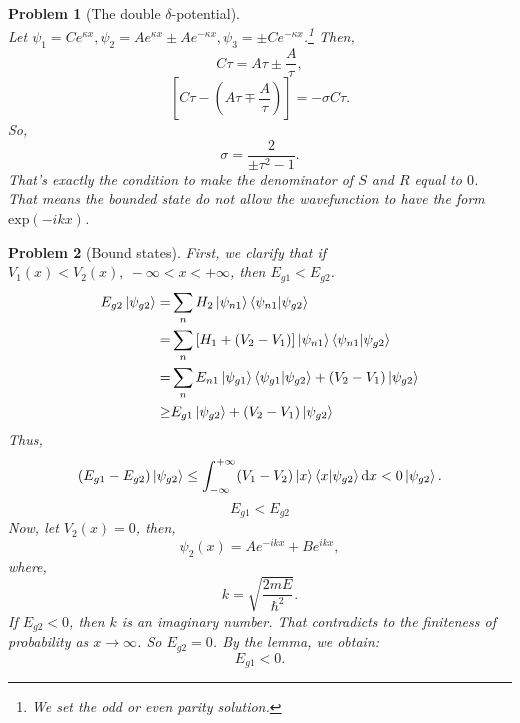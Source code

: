 \documentclass{article}
\theoremstyle{1}
\newtheorem{problem}{Problem}
\begin{document}
\begin{problem}[The double $\delta$-potential]
\begin{equation}
\end{equation}
Let $\psi_1=Ce^{\kappa x},\psi_2=Ae^{\kappa x}\pm Ae^{-\kappa x},\psi_3=\pm Ce^{-\kappa x}$.\footnote{We set the odd or even parity solution.} Then,
\begin{equation}
    C\tau=A\tau\pm\frac{A}{\tau},
\end{equation}
\begin{equation}
    \left[C\tau-\left(A\tau \mp\frac{A}{\tau}\right)\right]=-\sigma C\tau.
\end{equation}
So,
\begin{equation}
    \sigma=\frac{2}{\pm\tau^2-1}.
\end{equation}
That's exactly the condition to make the denominator of $S$ and $R$ equal to $0$. That means the bounded state do not allow the wavefunction to have the form $\mathrm{exp}(-ikx)$.
\end{problem}
\begin{problem}[Bound states]
First, we clarify that if $V_1(x)<V_2(x),\ -\infty<x<+\infty$, then $E_{g1}<E_{g2}$. 
\begin{align}
    E_{g2}\ket{\psi_{g2}}=&\sum_{n}H_2\ket{\psi_{n1}}\braket{\psi_{n1}}{\psi_{g2}}\\
    =&\sum_{n}\left[H_1+(V_2-V_1)\right]\ket{\psi_{n1}}\braket{\psi_{n1}}{\psi_{g2}}\\
    =&\sum_{n}E_{n1}\ket{\psi_{g1}}\braket{\psi_{g1}}{\psi_{g2}}+(V_2-V_1)\ket{\psi_{g2}}\\
    \ge&E_{g1}\ket{\psi_{g2}}+(V_2-V_1)\ket{\psi_{g2}}
\end{align}
Thus,
\begin{equation}
    \left(E_{g1}-E_{g2}\right)\ket{\psi_{g2}}\le \int_{-\infty}^{+\infty}(V_1-V_2)\ket{x}\braket{x}{\psi_{g2}}\dd{x}<0\ket{\psi_{g2}}.
\end{equation}
\begin{equation}
    \boxed{E_{g1}<E_{g2}}
\end{equation}
Now,  let $V_2(x)=0$, then,
\begin{equation}
    \psi_2(x)=Ae^{-ikx}+Be^{ikx},
\end{equation}
where,
\begin{equation}
    k=\sqrt{\frac{2mE}{\hbar^2}}.
\end{equation}
If $E_{g2}<0$, then $k$ is an imaginary number. That contradicts to the finiteness of probability as $x\rightarrow\infty$. So $E_{g2}=0$. By the lemma, we obtain:
\begin{equation}
    \boxed{E_{g1}<0.}
\end{equation}
\end{problem}
\end{document}
